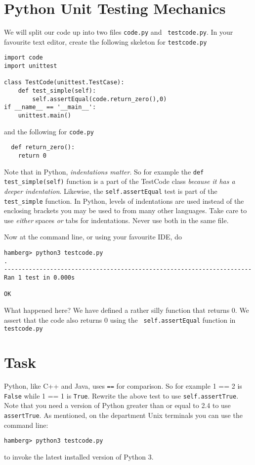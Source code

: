 \documentclass{paper}
\begin{document}
\section*{Python Unit Testing Mechanics}
We will split our code up into two files {\tt code.py} and {\tt
  testcode.py}. In your favourite text editor, create
the following skeleton for {\tt testcode.py}

\begin{lstlisting}
import code
import unittest

class TestCode(unittest.TestCase):
    def test_simple(self):
        self.assertEqual(code.return_zero(),0)
if __name__ == '__main__':
    unittest.main()
\end{lstlisting}

and the following for {\tt code.py}

\begin{lstlisting}
  def return_zero():
    return 0
\end{lstlisting}
Note that in Python, \emph{indentations matter}. So for example the {\tt def test\_simple(self)} function is a part of the TestCode class \emph{because it has a deeper indentation}. Likewise, the {\tt self.assertEqual} test is part of the {\tt test\_simple} function. In Python, levels of indentations are used instead of the enclosing brackets you may be used to from many other languages. Take care to use \emph{either} spaces \emph{or} tabs for indentations. Never use both in the same file.

Now at the command line, or using your favourite IDE, do
\begin{verbatim}
hamberg> python3 testcode.py
.
----------------------------------------------------------------------
Ran 1 test in 0.000s

OK

\end{verbatim}
What happened here? We have defined a rather silly function that
returns 0. We assert that the code also returns 0 using the {\tt
  self.assertEqual} function in {\tt testcode.py} 
\section{Task}
Python, like C++ and Java, uses {\tt ==} for comparison. So for example {1 == 2}
is {\tt False} while {1 == 1} is {\tt True}. Rewrite the above test to use
{\tt self.assertTrue}. Note that you need a version of Python greater than or
equal to 2.4 to use {\tt assertTrue}. As mentioned, on the department Unix
terminals you can use the command line:
\begin{verbatim}
hamberg> python3 testcode.py
\end{verbatim}
to invoke the latest installed version of Python 3.
\end{document}
